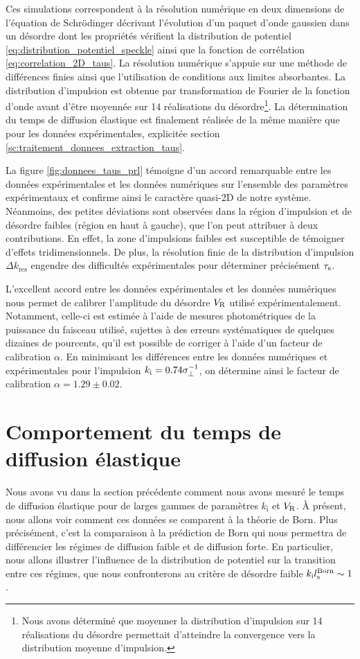Ces simulations correspondent à la résolution numérique en deux dimensions de l'équation de Schrödinger décrivant l'évolution d'un paquet d'onde gaussien dans un désordre dont les propriétés vérifient la distribution de potentiel \ref{eq:distribution_potentiel_speckle} ainsi que la fonction de corrélation \ref{eq:correlation_2D_taus}. La résolution numérique s'appuie sur une méthode de différences finies ainsi que l'utilisation de conditions aux limites absorbantes. La distribution d'impulsion est obtenue par transformation de Fourier de la fonction d'onde avant d'être moyennée sur 14 réalisations du désordre\footnote{Nous avons déterminé que moyenner la distribution d'impulsion sur 14 réalisations du désordre permettait d'atteindre la convergence vers la distribution moyenne d'impulsion.}. La détermination du temps de diffusion élastique est finalement réalisée de la même manière que pour les données expérimentales, explicitée section \ref{sc:traitement_donnees_extraction_taus}.

La figure \ref{fig:donnees_taus_prl} témoigne d'un accord remarquable entre les données expérimentales et les données numériques sur l'ensemble des paramètres expérimentaux et confirme ainsi le caractère quasi-2D de notre système. Néanmoins, des petites déviations sont observées dans la région d'impulsion et de désordre faibles (région en haut à gauche), que l'on peut attribuer à deux contributions. En effet, la zone d'impulsions faibles est susceptible de témoigner d'effets tridimensionnels. De plus, la résolution finie de la distribution d'impulsion $\Delta k_{\mathrm{res}}$ engendre des difficultés expérimentales pour déterminer précisément $\tau_{\mathrm{s}}$.

L'excellent accord entre les données expérimentales et les données numériques nous permet de calibrer l'amplitude du désordre $V_{\mathrm{R}}$ utilisé expérimentalement. Notamment, celle-ci est estimée à l'aide de mesures photométriques de la puissance du faisceau utilisé, sujettes à des erreurs systématiques de quelques dizaines de pourcents, qu'il est possible de corriger à l'aide d'un facteur de calibration $\alpha$. En minimisant les différences entre les données numériques et expérimentales pour l'impulsion $k_{\mathrm{i}}=0.74 \sigma_{\perp}^{-1}$, on détermine ainsi le facteur de calibration $\alpha=1.29\pm0.02$.




\section{Comportement du temps de diffusion élastique}
\label{sc:comportement_taus}
Nous avons vu dans la section précédente comment nous avons mesuré le temps de diffusion élastique pour de larges gammes de paramètres $k_{\mathrm{i}}$ et $V_{\mathrm{R}}$. À présent, nous allons voir comment ces données se comparent à la théorie de Born. Plus précisément, c'est la comparaison à la prédiction de Born qui nous permettra de différencier les régimes de diffusion faible et de diffusion forte. En particulier, nous allons illustrer l'influence de la distribution de potentiel sur la transition entre ces régimes, que nous confronterons au critère de désordre faible $k_{\mathrm{i}}l_{\mathrm{s}}^{\mathrm{Born}}\sim 1$.

